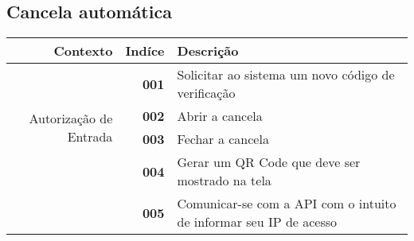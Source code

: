 \documentclass[a4paper,12pt]{article}
\begin{document}
\subsection{Cancela automática}

\begin{table}[H]
    \begin{tabularx}{\linewidth}{ | r | r | X | }
        \hline
        \bf{Contexto} &\bf{Indíce}& \bf{Descrição} \\
        \hline
        \multirow{4}{7.5em}{Autorização de Entrada}  
            & \bf{001} & Solicitar ao sistema um novo código de verificação \\ \cline{2-3}
            & \bf{002} & Abrir a cancela \\ \cline{2-3}
            & \bf{003} & Fechar a cancela \\ \cline{2-3}
            & \bf{004} & Gerar um QR Code que deve ser mostrado na tela \\ 
            & \bf{005} & Comunicar-se com a API com o intuito de informar seu IP de acesso \\
        \hline
    \end{tabularx}
\end{table}







\end{document}
